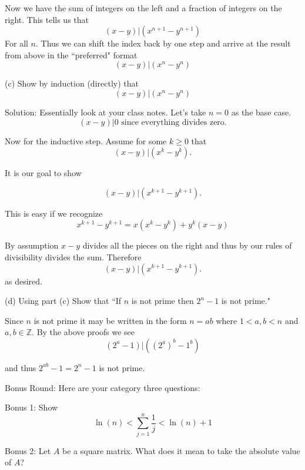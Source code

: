 \documentclass[16 pt]{amsart}
\theoremstyle{definition}
\theoremstyle{remark}
\numberwithin{equation}{subsection}
\newcommand{\Z}{\mathbb{Z}}
\begin{document}
Now we have the sum of integers on the left and a fraction of integers on the right.  This tells us that
\[
(x-y) | (x^{n+1}-y^{n+1})
\]
For all $n$.  Thus we can shift the index back by one step and arrive at the result from above in the ``preferred" format
\[
(x-y) | (x^n-y^n)
\]




\vspace{.5in}

(c) Show by induction (directly) that
\[
(x-y) | (x^n-y^n)
\]

\vspace{.5in}

Solution:  Essentially look at your class notes.  Let's take $n=0$ as the base case.
\[
(x-y)|0 \text{ since everything divides zero.}
\]

Now for the inductive step.  Assume for some $k\ge 0 $ that
\[
(x-y)|(x^k-y^k).
\]

It is our goal to show

\[
(x-y)|(x^{k+1}-y^{k+1}).
\]

This is easy if we recognize
\[
x^{k+1} - y^{k+1} = x(x^k - y^k) + y^k(x-y)
\]

By assumption $x-y$ divides all the pieces on the right and thus by our rules of divisibility divides the sum. Therefore
\[
(x-y)|(x^{k+1}-y^{k+1}).
\]
as desired.


\vspace{.5in}

(d) Using part (c) Show that ``If $n$ is not prime then $2^n -1$ is not prime." 


\vspace{.5in}

Since $n$ is not prime it may be written in the form $n=ab$ where $1<a,b<n$ and $a,b\in\Z$.  By the above proofs we see
\[
(2^a-1) | ((2^a)^b-1^b)
\]

and thus $2^{ab}-1 = 2^n-1$ is not prime.

\newpage


Bonus Round:  Here are your category three questions:

Bonus 1: Show 
\[
\ln(n) < \sum_{j=1}^{n} \frac{1}{j} < \ln(n)+1
\]

\vspace{.75in}

Bonus 2: Let $A$ be a square matrix.  What does it mean to take the absolute value of $A$?
\end{document}
